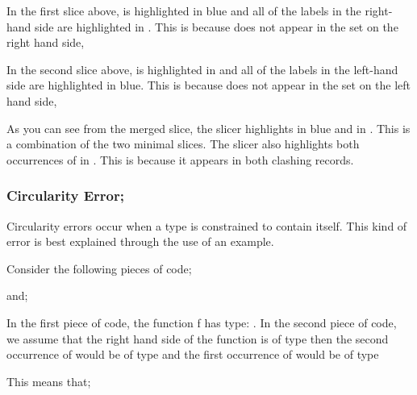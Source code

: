 \documentclass{article}
\begin{document}
\begin{itemize}
In the first slice above,  is highlighted in blue
and all of the labels in the right-hand side are highlighted in
\tesEndPointOne. This is because  does not
appear in the set on the right hand side, 

In the second slice above,  is highlighted in
\tesEndPointOne and all of the labels in the left-hand side are
highlighted in blue. This is because  does not appear
in the set on the left hand side, 

As you can see from the merged slice, the slicer highlights
 in blue and  in
\tesEndPointOne. This is a combination of the two minimal slices. The slicer
also highlights both occurrences of  in
\tesEndPointOne. This is because it appears in both clashing records.


\newpage


\subsubsection{Circularity Error;}

\subitem Circularity errors occur when a type is constrained to
contain itself. This kind of error is best explained through the use
of an example.

Consider the following pieces of code;


and;


In the first piece of code, the function f has type:
.  In the second piece of code, we assume
that the right hand side of the function is of type 
then the second occurrence of  would be of type
 and the first occurrence of
 would be of type 

This means that;



\end{itemize}
\end{document}
